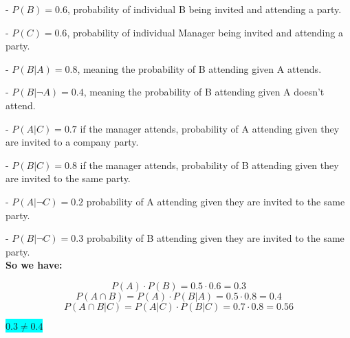 \documentclass[12pt]{article}
\begin{document}
- $P(B)=0.6$, probability of individual B being invited and attending a party.

- $P(C)=0.6$, probability of individual Manager being invited and attending a party.

- $P(B|A)=0.8$, meaning the probability of B attending given A attends.

- $P(B|\neg A)=0.4$, meaning the probability of B attending given A doesn't attend.

- $P(A|C)=0.7$ if the manager attends, probability of A attending given they are invited to a company party.

- $P(B|C)=0.8$ if the manager attends, probability of B attending given they are invited to the same party.

- $P(A|\neg C)=0.2$ probability of A attending given they are invited to the same party.

- $P(B|\neg C)=0.3$ probability of B attending given they are invited to the same party.\\[20pt]

\textbf{So we have:}

\[
P(A) \cdot P(B) = 0.5 \cdot 0.6 = 0.3
\]
\[
P(A \cap B) = P(A) \cdot P(B|A) = 0.5 \cdot 0.8 = 0.4
\]
\[
P(A \cap B | C) = P(A | C) \cdot P(B | C) = 0.7 \cdot 0.8 = 0.56
\]
\begin{center}
    \colorbox{cyan}{\( 0.3 \neq 0.4 \)}
\end{center}
\end{document}
